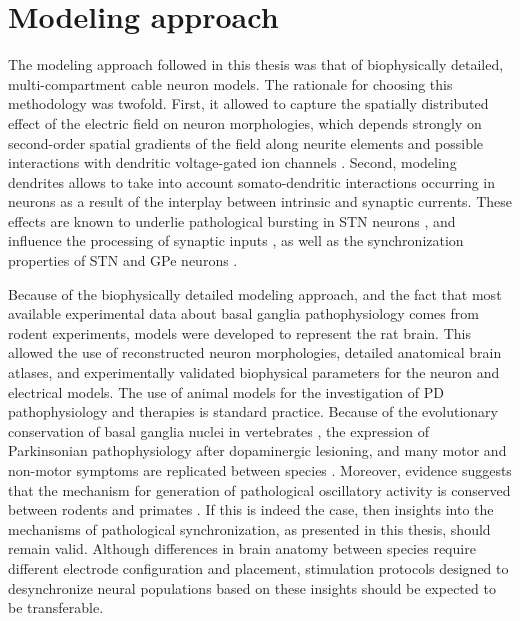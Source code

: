 %
%
%

\section{Modeling approach}
\label{sec:ch6-discussion-modeling-approach}
%
The modeling approach followed in this thesis was that of biophysically
detailed, multi-compartment cable neuron models. The rationale for choosing
this methodology was twofold. First, it allowed to capture the spatially distributed
effect of the electric field on neuron morphologies, which depends strongly
on second-order spatial gradients of the field along neurite elements \cite{rattay_basic_1999}
and possible interactions with dendritic voltage-gated ion channels \cite{rattay_which_2010}.
Second, modeling dendrites allows to take into account somato-dendritic interactions
occurring in neurons as a result of the interplay between intrinsic and
synaptic currents. These effects are known to underlie pathological bursting
in STN neurons \cite{gillies_membrane_2005,beurrier_subthalamic_1999,otsuka_excitatory_2001,song_characterization_2000},
and influence the processing of synaptic inputs \cite{hanson_sodium_2004,chan_hcn2_2004},
as well as the synchronization properties of STN and GPe neurons \cite{schultheiss_phase_2010,farries_phase_2012}.

%
Because of the biophysically detailed modeling approach, and the fact that
most available experimental data about basal ganglia pathophysiology
comes from rodent experiments, models were developed to represent the rat brain.
This allowed the use of reconstructed neuron morphologies, detailed anatomical brain atlases,
and experimentally validated biophysical parameters for the neuron and electrical models.
The use of animal models for the investigation of PD pathophysiology
and therapies is standard practice.
Because of the evolutionary conservation of basal ganglia nuclei in vertebrates
\cite{grillner_basal_2016}, the expression of Parkinsonian pathophysiology
after dopaminergic lesioning, and many motor and non-motor symptoms are
replicated between species \cite{blesa_classic_2012}.
Moreover, evidence suggests that the mechanism for generation of pathological
oscillatory activity is conserved between rodents and primates \cite{sherman_neural_2016}.
If this is indeed the case, then insights into the mechanisms of pathological
synchronization, as presented in this thesis, should remain valid.
Although differences in brain anatomy between species require different
electrode configuration and placement, stimulation protocols designed to
desynchronize neural populations based on these insights should be
expected to be transferable.
%
%


